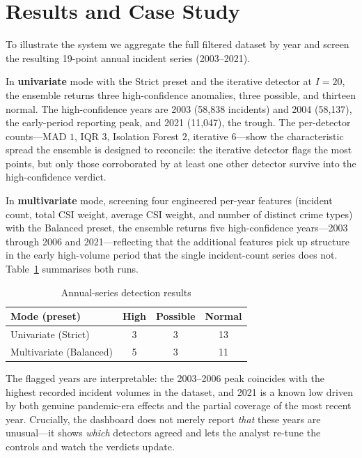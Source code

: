 \documentclass[conference]{IEEEtran}
\begin{document}
\section{Results and Case Study}
To illustrate the system we aggregate the full filtered dataset by year and screen the resulting 19-point annual incident series (2003--2021).

In \textbf{univariate} mode with the Strict preset and the iterative detector at $I=20$, the ensemble returns three high-confidence anomalies, three possible, and thirteen normal. The high-confidence years are 2003 (58{,}838 incidents) and 2004 (58{,}137), the early-period reporting peak, and 2021 (11{,}047), the trough. The per-detector counts---MAD $1$, IQR $3$, Isolation Forest $2$, iterative $6$---show the characteristic spread the ensemble is designed to reconcile: the iterative detector flags the most points, but only those corroborated by at least one other detector survive into the high-confidence verdict.

In \textbf{multivariate} mode, screening four engineered per-year features (incident count, total CSI weight, average CSI weight, and number of distinct crime types) with the Balanced preset, the ensemble returns five high-confidence years---2003 through 2006 and 2021---reflecting that the additional features pick up structure in the early high-volume period that the single incident-count series does not. Table~\ref{tab:results} summarises both runs.

\begin{table}[t]
\caption{Annual-series detection results}
\label{tab:results}
\centering
\begin{tabular}{lccc}
\hline
\textbf{Mode (preset)} & \textbf{High} & \textbf{Possible} & \textbf{Normal} \\
\hline
Univariate (Strict)   & 3 & 3 & 13 \\
Multivariate (Balanced) & 5 & 3 & 11 \\
\hline
\end{tabular}
\end{table}

The flagged years are interpretable: the 2003--2006 peak coincides with the highest recorded incident volumes in the dataset, and 2021 is a known low driven by both genuine pandemic-era effects and the partial coverage of the most recent year. Crucially, the dashboard does not merely report \textit{that} these years are unusual---it shows \textit{which} detectors agreed and lets the analyst re-tune the controls and watch the verdicts update.
\end{document}
